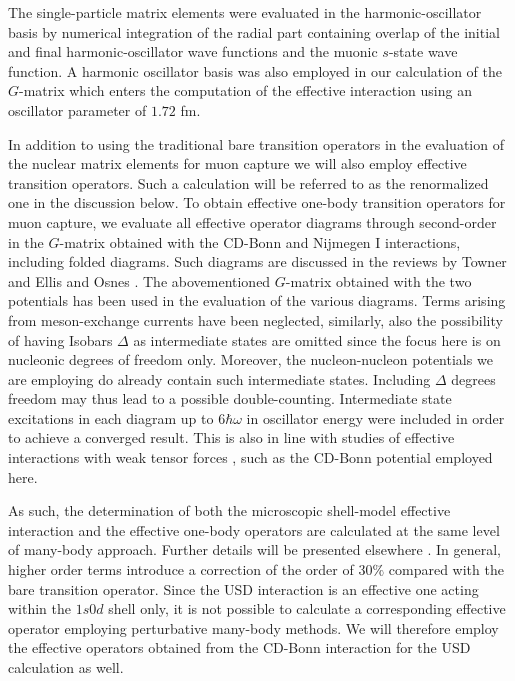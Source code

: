 \begin{multicols}{2}
The single-particle
matrix elements were evaluated in the harmonic-oscillator basis
by numerical integration of the radial
part containing overlap of the initial and final harmonic-oscillator
wave functions and the muonic $s$-state wave function.
A harmonic oscillator basis was also employed in our calculation
of the $G$-matrix which enters the computation of the effective
interaction using an oscillator parameter of $1.72$ fm.

In addition to using the
traditional bare transition operators in the evaluation of the nuclear
matrix elements for muon capture we will also employ
effective transition operators. Such a calculation
will be referred to as the renormalized one in the discussion
below. To obtain effective one-body
transition operators for muon capture, we evaluate all
effective operator diagrams through second-order in the
$G$-matrix obtained with  the CD-Bonn and Nijmegen I interactions,
including folded diagrams. Such diagrams
are discussed in the reviews by Towner \cite{towner87}
and Ellis and Osnes \cite{eo77}. The abovementioned $G$-matrix
obtained with the two potentials has been used in the evaluation
of the various diagrams.
Terms arising from meson-exchange currents have
been neglected, similarly, also the possibility
of having Isobars $\Delta$ as intermediate states are omitted
since the focus here is  on nucleonic degrees
of freedom only. Moreover, the nucleon-nucleon potentials
we are employing do already contain such intermediate states.
Including $\Delta$ degrees freedom may thus lead to a possible
double-counting.
Intermediate state excitations in each diagram
up to $6\hbar\omega$ in oscillator energy were included
in order to achieve a converged result. This is also in line
with studies of effective interactions with weak tensor
forces \cite{sommerman},
such as the CD-Bonn potential employed here.

As such, the determination of both the microscopic
shell-model effective interaction and the effective
one-body operators are calculated at the same level of many-body
approach. Further details will be presented elsewhere \cite{ssh98}.
In general, higher order terms introduce a correction of the
order of $30\%$ compared with the bare transition operator.
Since the USD interaction is an effective one acting
within the $1s0d$ shell only, it is not possible to calculate
a corresponding effective operator employing perturbative
many-body methods. We will therefore employ the effective operators obtained
from the CD-Bonn interaction for the USD calculation as well.


\end{multicols}
